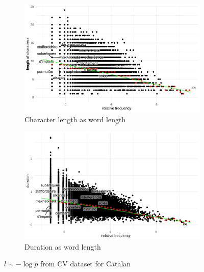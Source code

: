 \begin{figure}[H]
  \centering
  \begin{subfigure}[b]{0.48\textwidth}
    \centering
    \includegraphics[width=\textwidth]{plots/Catalan_logp_cl_CV.pdf}
    \caption{Character length as word length}
  \end{subfigure}
  \hfill
  \begin{subfigure}[b]{0.48\textwidth}
    \centering
    \includegraphics[width=\textwidth]{plots/Catalan_logp_d_CV.pdf}
    \caption{Duration as word length}
  \end{subfigure}
  \caption{$l \sim -\log p$ from CV dataset for Catalan}
\end{figure}

